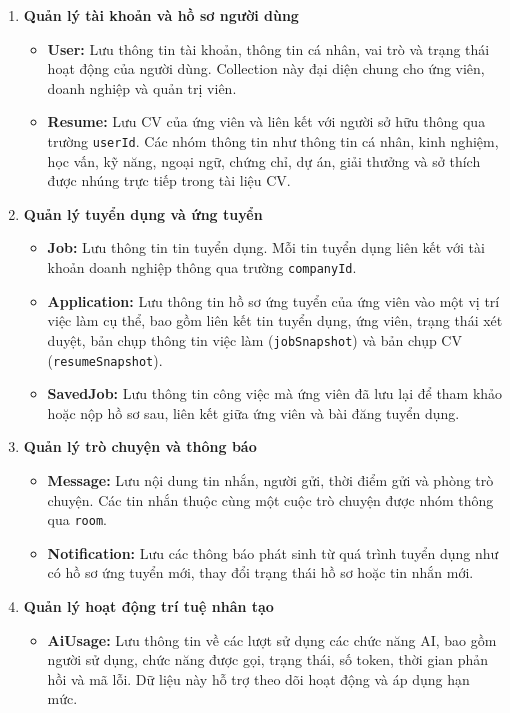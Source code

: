 \begin{enumerate}
    \item \textbf{Quản lý tài khoản và hồ sơ người dùng}
    \begin{itemize}
        \item \textbf{User:} Lưu thông tin tài khoản, thông tin cá nhân, vai trò và trạng thái hoạt động của người dùng. Collection này đại diện chung cho ứng viên, doanh nghiệp và quản trị viên.

        \item \textbf{Resume:} Lưu CV của ứng viên và liên kết với người sở hữu thông qua trường \texttt{userId}. Các nhóm thông tin như thông tin cá nhân, kinh nghiệm, học vấn, kỹ năng, ngoại ngữ, chứng chỉ, dự án, giải thưởng và sở thích được nhúng trực tiếp trong tài liệu CV.
    \end{itemize}

    \item \textbf{Quản lý tuyển dụng và ứng tuyển}
    \begin{itemize}
        \item \textbf{Job:} Lưu thông tin tin tuyển dụng. Mỗi tin tuyển dụng liên kết với tài khoản doanh nghiệp thông qua trường \texttt{companyId}.

        \item \textbf{Application:} Lưu thông tin hồ sơ ứng tuyển của ứng viên vào một vị trí việc làm cụ thể, bao gồm liên kết tin tuyển dụng, ứng viên, trạng thái xét duyệt, bản chụp thông tin việc làm (\texttt{jobSnapshot}) và bản chụp CV (\texttt{resumeSnapshot}).

        \item \textbf{SavedJob:} Lưu thông tin công việc mà ứng viên đã lưu lại để tham khảo hoặc nộp hồ sơ sau, liên kết giữa ứng viên và bài đăng tuyển dụng.
    \end{itemize}

    \item \textbf{Quản lý trò chuyện và thông báo}
    \begin{itemize}
        \item \textbf{Message:} Lưu nội dung tin nhắn, người gửi, thời điểm gửi và phòng trò chuyện. Các tin nhắn thuộc cùng một cuộc trò chuyện được nhóm thông qua \texttt{room}.

        \item \textbf{Notification:} Lưu các thông báo phát sinh từ quá trình tuyển dụng như có hồ sơ ứng tuyển mới, thay đổi trạng thái hồ sơ hoặc tin nhắn mới.
    \end{itemize}

    \item \textbf{Quản lý hoạt động trí tuệ nhân tạo}
    \begin{itemize}
        \item \textbf{AiUsage:} Lưu thông tin về các lượt sử dụng các chức năng AI, bao gồm người sử dụng, chức năng được gọi, trạng thái, số token, thời gian phản hồi và mã lỗi. Dữ liệu này hỗ trợ theo dõi hoạt động và áp dụng hạn mức.
    \end{itemize}

\end{enumerate}

